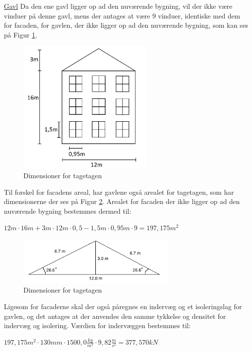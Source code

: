 \underline{Gavl}
\newline
Da den ene gavl ligger op ad den nuværende bygning, vil der ikke være vinduer på denne gavl, mens der antages at være 9 vinduer, identiske med dem for facaden, for gavlen, der ikke ligger op ad den nuværende bygning, som kan ses på Figur \ref{fig:gavl}.

\begin{figure}[htbp]
	\centering
	\includegraphics[width=0.6\textwidth]{billeder/facadevestellerost.png}
	\caption{Dimensioner for tagetagen}
	\label{fig:gavl}
\end{figure}

Til forskel for facadens areal, har gavlene også arealet for tagetagen, som har dimensionerne der ses på Figur \ref{fig:tagetage}. Arealet for facaden der ikke ligger op ad den nuværende bygning bestemmes dermed til:
\begin{center}
	$12 m\cdot 16 m + 3 m\cdot 12 m \cdot 0,\!5 - 1,\!5 m\cdot 0,\!95 m \cdot 9=197,\!175 m^2$
\end{center}

\begin{figure}[htbp]
	\centering
	\includegraphics[width=0.7\textwidth]{billeder/Tagmedvinkel.png}
	\caption{Dimensioner for tagetagen}
	\label{fig:tagetage}
\end{figure}

Ligesom for facaderne skal der også påregnes en indervæg og et isoleringslag for gavlen, og det antages at der anvendes den samme tykkelse og densitet for indervæg og isolering.
\newline
\newline
Værdien for indervæggen bestemmes til:
\begin{center}
	$197,\!175 m^2\cdot 130 mm\cdot 1500,\!0 \frac{kg}{m^3}\cdot 9,\!82 \frac{m}{s^2}=377,\!570 kN$
\end{center}

